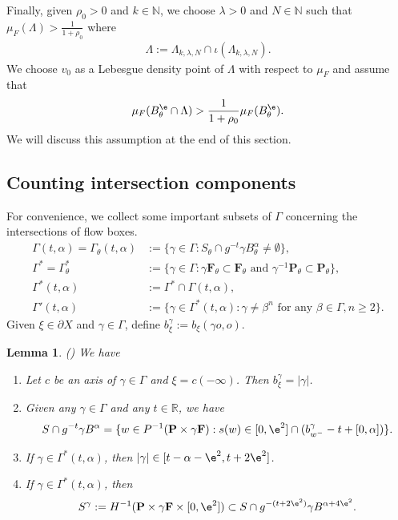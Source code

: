 \documentclass[11pt]{amsart}
\newtheorem{lemma}[theorem]{Lemma}
\theoremstyle{definition}
\def\pX{{\partial X}}
\def\RR{{\mathbb R}}
\def\NN{{\mathbb N}}
\def\a{\alpha}
\def\b{\beta}
\def\c{\gamma}   \def\C{\Gamma}
\def\l{\lambda}   \def\L{\Lambda}
\def\bP{\textbf{P}}
\def\bF{\textbf{F}}
\begin{document}
Finally, given $\rho_0>0$ and $k\in \NN$, we choose $\l>0$ and $N\in \NN$ such that $\mu_F(\L)>\frac{1}{1+\rho_0}$ where 
\begin{equation*}
\begin{aligned}
\L:=\L_{k,\l,N}\cap \iota(\L_{k,\l,N}).
\end{aligned}
\end{equation*}
We choose $v_0$ as a Lebesgue density point of $\L$ with respect to $\mu_F$ and assume that
\begin{equation}\label{density}
\begin{aligned}
\mu_F(B^\e_{\theta}\cap \L)>\frac{1}{1+\rho_0}\mu_F(B^\e_{\theta}).
\end{aligned}
\end{equation}
We will discuss this assumption at the end of this section.


\subsection{Counting intersection components}
For convenience, we collect some important subsets of $\C$ concerning the intersections of flow boxes.
\begin{equation*}
\begin{aligned}
\C(t,\a)=\C_\theta(t,\a)&:=\{\c\in \C: S_\theta\cap g^{-t}\c B_\theta^\a\neq \emptyset\},\\
\C^*=\C^*_\theta&:=\{\c\in \C: \c\bF_\theta \subset \bF_\theta \text{\ and\ }\c^{-1}\bP_\theta\subset \bP_\theta\},\\
\C^*(t,\a)&:=\C^*\cap \C(t,\a),\\
\C'(t,\a)&:=\{\c\in \C^*(t,\a): \c\neq \b^n \text{\ for any\ } \b\in \C, n\ge 2\}.
\end{aligned}
\end{equation*}
Given $\xi\in \pX$ and $\c\in \C$, define $b_\xi^\c:=b_\xi(\c o, o)$.
\begin{lemma}\label{intersection2}(\cite[Lemmas 4.2-4.5]{Wu2})
We have
\begin{enumerate}
    \item Let $c$ be an axis of $\c\in \C$ and $\xi=c(-\infty)$. Then $b_\xi^\c=|\c|$.
    \item Given any $\c\in \C$ and any $t\in \RR$, we have
$$S\cap g^{-t}\c B^\a=\{w\in P^{-1}(\bP\times \c\bF): s(w)\in [0,\e^2]\cap (b_{w^{-}}^\c-t+[0,\a])\}.$$
    \item If $\c\in \C^*(t,\a)$, then $|\c|\in [t-\a-\e^2, t+2\e^2]$.
    \item If $\c\in \C^*(t,\a)$, then
$$S^\c:=H^{-1}(\bP\times \c\bF\times [0,\e^2])\subset S\cap g^{-(t+2\e^2)}\c B^{\a+4\e^2}.$$
\end{enumerate}
\end{lemma}
\end{document}
